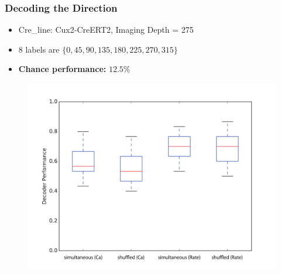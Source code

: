 \documentclass[10pt,mathserif]{beamer}
\begin{document}
\begin{frame}
\frametitle{\bf Decoding the Direction}
\begin{itemize}
\item Cre\_line:  Cux2-CreERT2, Imaging Depth = 275\pause
\item 8 labels are $\{0,45,90,135,180,225,270,315\}$\pause
\item \textbf{Chance performance:} $12.5 \%$\pause
\end{itemize}
\begin{figure}
\includegraphics[scale=0.42]{sim_shf_p.pdf}
\end{figure}
   \end{frame}
\end{document}
